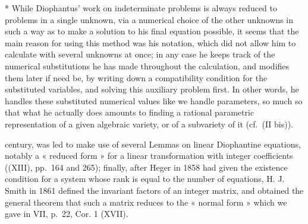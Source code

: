 * While Diophantus' work on indeterminate problems is always reduced to problems in a single unknown, via a numerical choice of the other unknowns in such a way as to make a solution to his final equation possible, it seems that the main reason for using this method was his notation, which did not allow him to calculate with several unknowns at once; in any case he keeps track of the numerical substitutions he has made throughout the calculation, and modifies them later if need be, by writing down a compatibility condition for the substituted variables, and solving this auxiliary problem first. In other words, he handles these substituted numerical values like we handle parameters, so much so that what he actually does amounts to finding a rational parametric representation of a given algebraic variety, or of a subvariety of it (cf.~(II bis)).

century, was led to make use of several Lemmas on linear Diophantine equations, notably a « reduced form » for a linear transformation with integer coefficients ((XIII), pp.~164 and 265); finally, after Heger in 1858 had given the existence condition for a system whose rank is equal to the number of equations, H. J. Smith in 1861 defined the invariant factors of an integer matrix, and obtained the general theorem that such a matrix reduces to the « normal form » which we gave in VII, p.~22, Cor. 1 (XVII).

